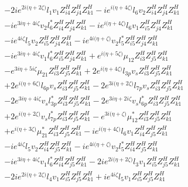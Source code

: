 \begin{align}
 &-2 i e^{2 i \Big(\eta +2 \zeta \Big)} l_1 v_1 Z_{{i 4}}^{H} Z_{{j 4}}^{H} Z_{{k 1}}^{H} -i e^{i \Big(\eta +4 \zeta \Big)} l_6 v_2 Z_{{i 4}}^{H} Z_{{j 4}}^{H} Z_{{k 1}}^{H} \nonumber \\ 
 &-i e^{3 i \eta +4 i \zeta } v_2 l_6^* Z_{{i 4}}^{H} Z_{{j 4}}^{H} Z_{{k 1}}^{H} -i e^{i \Big(\eta +4 \zeta \Big)} l_6 v_1 Z_{{i 5}}^{H} Z_{{j 4}}^{H} Z_{{k 1}}^{H} \nonumber \\ 
 &-i e^{4 i \zeta } l_5 v_2 Z_{{i 5}}^{H} Z_{{j 4}}^{H} Z_{{k 1}}^{H} -i e^{4 i \Big(\eta +\zeta \Big)} v_2 l_5^* Z_{{i 5}}^{H} Z_{{j 4}}^{H} Z_{{k 1}}^{H} \nonumber \\ 
 &-i e^{3 i \eta +4 i \zeta } v_1 l_6^* Z_{{i 5}}^{H} Z_{{j 4}}^{H} Z_{{k 1}}^{H} +e^{i \Big(\eta +5 \zeta \Big)} \mu_{12} Z_{{i 3}}^{H} Z_{{j 5}}^{H} Z_{{k 1}}^{H} \nonumber \\ 
 &- e^{3 i \eta +5 i \zeta } \mu_{21} Z_{{i 3}}^{H} Z_{{j 5}}^{H} Z_{{k 1}}^{H} +2 e^{i \Big(\eta +4 \zeta \Big)} l_{3p} v_s Z_{{i 3}}^{H} Z_{{j 5}}^{H} Z_{{k 1}}^{H} \nonumber \\ 
 &+2 e^{i \Big(\eta +6 \zeta \Big)} l_{6p} v_s Z_{{i 3}}^{H} Z_{{j 5}}^{H} Z_{{k 1}}^{H} -2 e^{3 i \Big(\eta +2 \zeta \Big)} l_{7p} v_s Z_{{i 3}}^{H} Z_{{j 5}}^{H} Z_{{k 1}}^{H} \nonumber \\ 
 &-2 e^{3 i \eta +4 i \zeta } v_s l_{3p}^* Z_{{i 3}}^{H} Z_{{j 5}}^{H} Z_{{k 1}}^{H} -2 e^{3 i \eta +2 i \zeta } v_s l_{6p}^* Z_{{i 3}}^{H} Z_{{j 5}}^{H} Z_{{k 1}}^{H} \nonumber \\ 
 &+2 e^{i \Big(\eta +2 \zeta \Big)} v_s l_{7p}^* Z_{{i 3}}^{H} Z_{{j 5}}^{H} Z_{{k 1}}^{H} - e^{3 i \Big(\eta +\zeta \Big)} \mu_{12}^* Z_{{i 3}}^{H} Z_{{j 5}}^{H} Z_{{k 1}}^{H} \nonumber \\ 
 &+e^{i \Big(\eta +3 \zeta \Big)} \mu_{21}^* Z_{{i 3}}^{H} Z_{{j 5}}^{H} Z_{{k 1}}^{H} -i e^{i \Big(\eta +4 \zeta \Big)} l_6 v_1 Z_{{i 4}}^{H} Z_{{j 5}}^{H} Z_{{k 1}}^{H} \nonumber \\ 
 &-i e^{4 i \zeta } l_5 v_2 Z_{{i 4}}^{H} Z_{{j 5}}^{H} Z_{{k 1}}^{H} -i e^{4 i \Big(\eta +\zeta \Big)} v_2 l_5^* Z_{{i 4}}^{H} Z_{{j 5}}^{H} Z_{{k 1}}^{H} \nonumber \\ 
 &-i e^{3 i \eta +4 i \zeta } v_1 l_6^* Z_{{i 4}}^{H} Z_{{j 5}}^{H} Z_{{k 1}}^{H} -2 i e^{2 i \Big(\eta +2 \zeta \Big)} l_3 v_1 Z_{{i 5}}^{H} Z_{{j 5}}^{H} Z_{{k 1}}^{H} \nonumber \\ 
 &-2 i e^{2 i \Big(\eta +2 \zeta \Big)} l_4 v_1 Z_{{i 5}}^{H} Z_{{j 5}}^{H} Z_{{k 1}}^{H} +i e^{4 i \zeta } l_5 v_1 Z_{{i 5}}^{H} Z_{{j 5}}^{H} Z_{{k 1}}^{H} \nonumber \\ 

\end{align}
